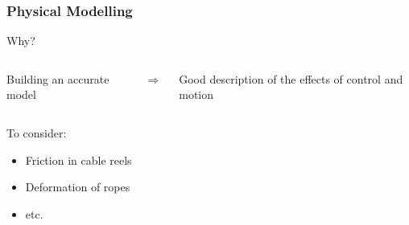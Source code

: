 \begin{frame}[c]
	\frametitle{Physical Modelling}
		Why?
		\begin{columns}
				\centering
				\begin{tcolorbox}[width=\linewidth,colback={green}]
					Building an accurate model
				\end{tcolorbox}
				\centering
				\Huge{$\Rightarrow$}
				\centering
				\begin{tcolorbox}[width=\linewidth,colback={green}]
					Good description of the effects of control and motion
				\end{tcolorbox}
		\end{columns}
	\vspace{0.5cm}
	\onslide<2>
		To consider:
		\begin{itemize}
			\item{Friction in cable reels}
			\item{Deformation of ropes}
			\item{etc.}
		\end{itemize}
\end{frame}


